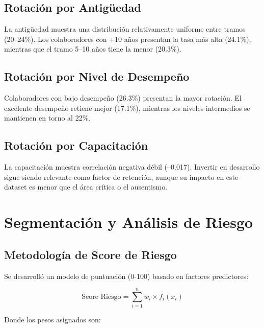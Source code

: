 \documentclass[11pt,a4paper,twoside]{article}
\begin{document}
\subsection{Rotación por Antigüedad}

La antigüedad muestra una distribución relativamente uniforme entre tramos (20--24\%). Los colaboradores con +10 años presentan la tasa más alta (24.1\%), mientras que el tramo 5--10 años tiene la menor (20.3\%).

\subsection{Rotación por Nivel de Desempeño}

Colaboradores con bajo desempeño (26.3\%) presentan la mayor rotación. El excelente desempeño retiene mejor (17.1\%), mientras los niveles intermedios se mantienen en torno al 22\%.

\subsection{Rotación por Capacitación}

La capacitación muestra correlación negativa débil (--0.017). Invertir en desarrollo sigue siendo relevante como factor de retención, aunque su impacto en este dataset es menor que el área crítica o el ausentismo.

\newpage

\section{Segmentación y Análisis de Riesgo}

\subsection{Metodología de Score de Riesgo}

Se desarrolló un modelo de puntuación (0-100) basado en factores predictores:

\[
\text{Score Riesgo} = \sum_{i=1}^{n} w_i \times f_i(x_i)
\]

Donde los pesos asignados son:
\end{document}
